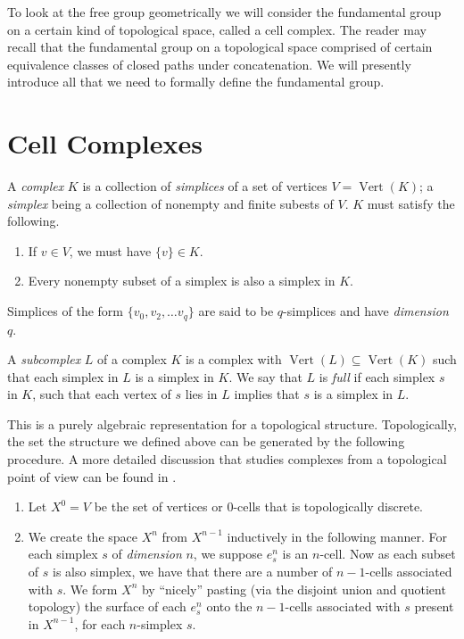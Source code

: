 To look at the free group geometrically we will consider the fundamental group on a certain kind of topological space, called a cell complex. The reader may recall that the fundamental group on a topological space comprised of certain equivalence classes of closed paths under concatenation. We will presently introduce all that we need to formally define the fundamental group.

\section{Cell Complexes}

\begin{definition}
  A \emph{complex} $K$ is a collection of \emph{simplices} of a set of vertices $V=\operatorname{Vert}(K)$; a \emph{simplex} being a collection of nonempty and finite subests of $V$. $K$ must satisfy the following.
  \begin{enumerate}
  \item If $v \in V$, we must have $\{v \} \in K$.
  \item Every nonempty subset of a simplex is also a simplex in $K$.
  \end{enumerate}
  Simplices of the form $\{ v_0, v_2, \dots v_q \}$ are said to be $q$-simplices and have \emph{dimension} $q$.
\end{definition}

\begin{definition}
  A \emph{subcomplex} $L$ of a complex $K$ is a complex with $\operatorname{Vert}(L) \subseteq \operatorname{Vert}(K)$ such that each simplex in $L$ is a simplex in $K$. We say that $L$ is \emph{full} if each simplex $s$ in $K$, such that each vertex of $s$ lies in $L$ implies that $s$ is a simplex in $L$.
\end{definition}

This is a purely algebraic representation for a topological structure. Topologically, the set the structure we defined above can be generated by the following procedure. A more detailed discussion that studies complexes from a topological point of view can be found in \cite{hatcher2002AT}.

\begin{enumerate}
\item Let $X^0 = V$ be the set of vertices or $0$-cells that is topologically discrete.
\item We create the space $X^n$ from $X^{n-1}$ inductively in the following manner. For each simplex $s$ of \emph{dimension} $n$, we suppose $e_{s}^n$ is an $n$-cell. Now as each subset of $s$ is also simplex, we have that there are a number of $n-1$-cells associated with $s$. We form $X^n$ by ``nicely'' pasting (via the disjoint union and quotient topology) the surface of each $e^n_s$ onto the $n-1$-cells associated with $s$ present in $X^{n-1}$, for each $n$-simplex $s$.
\end{enumerate}

